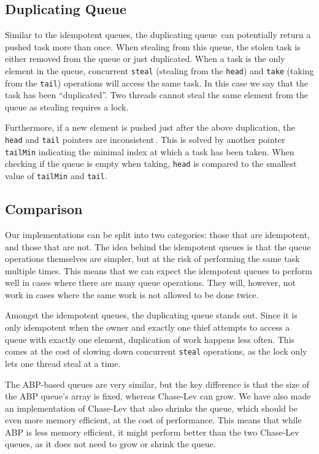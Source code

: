 \subsection{Duplicating Queue}
Similar to the idempotent queues, the duplicating queue\,\cite{Leijen:2009:DTP:1639949.1640106} can potentially return a pushed task more than once. 
When stealing from this queue, the stolen task is either removed from the queue or just duplicated. 
When a task is the only element in the queue, concurrent \texttt{steal} (stealing from the \texttt{head}) and \texttt{take} (taking from the \texttt{tail}) operations will access the same task.
In this case we say that the task has been ``duplicated''. 
Two threads cannot steal the same element from the queue as stealing requires a lock.

Furthermore, if a new element is pushed just after the above duplication, the \texttt{head} and \texttt{tail} pointers are inconsistent\,\cite{Leijen:2009:DTP:1639949.1640106}.
This is solved by another pointer \texttt{tailMin} indicating the minimal index at which a task has been taken. When checking if the queue is empty when taking, \texttt{head} is compared to the smallest value of \texttt{tailMin} and \texttt{tail}.

\subsection{Comparison}
Our implementations can be split into two categories: those that are idempotent, and those that are not. The idea behind the idempotent queues is that the queue operations themselves are simpler, but at the risk of performing the same task multiple times. This means that we can expect the idempotent queues to perform well in cases where there are many queue operations. They will, however, not work in cases where the same work is not allowed to be done twice.

Amongst the idempotent queues, the duplicating queue stands out. 
Since it is only idempotent when the owner and exactly one thief attempts to access a queue with exactly one element, duplication of work happens less often.
This comes at the cost of slowing down concurrent \texttt{steal} operations, as the lock only lets one thread steal at a time.

The ABP-based queues are very similar, but the key difference is that the size of the ABP queue's array is fixed, whereas Chase-Lev can grow.
We have also made an implementation of Chase-Lev that also shrinks the queue, which should be even more memory efficient, at the cost of performance.
This means that while ABP is less memory efficient, it might perform better than the two Chase-Lev queues, as it does not need to grow or shrink the queue. 
